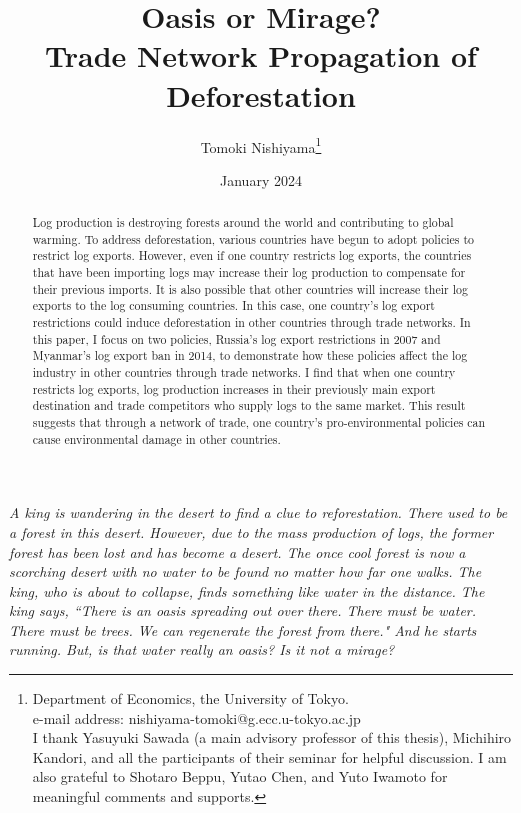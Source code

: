 \documentclass[a4paper,12pt]{article}
\begin{document}
\title{Oasis or Mirage? \\ \large{Trade Network Propagation of Deforestation}}
\author{Tomoki Nishiyama\footnote{Department of Economics, the University of Tokyo. \\ e-mail address: nishiyama-tomoki@g.ecc.u-tokyo.ac.jp \\ I thank Yasuyuki Sawada (a main advisory professor of this thesis), Michihiro Kandori, and all the participants of their seminar for helpful discussion. I am also grateful to Shotaro Beppu, Yutao Chen, and Yuto Iwamoto for meaningful comments and supports.}}
\date{January 2024}
\maketitle

\begin{abstract}
    Log production is destroying forests around the world and contributing to global warming. To address deforestation, various countries have begun to adopt policies to restrict log exports. However, even if one country restricts log exports, the countries that have been importing logs may increase their log production to compensate for their previous imports. It is also possible that other countries will increase their log exports to the log consuming countries. In this case, one country's log export restrictions could induce deforestation in other countries through trade networks. In this paper, I focus on two policies, Russia's log export restrictions in 2007 and Myanmar's log export ban in 2014, to demonstrate how these policies affect the log industry in other countries through trade networks. I find that when one country restricts log exports, log production increases in their previously main export destination and trade competitors who supply logs to the same market. This result suggests that through a network of trade, one country's pro-environmental policies can cause environmental damage in other countries.
\end{abstract}

\textit{
    A king is wandering in the desert to find a clue to reforestation. There used to be a forest in this desert. However, due to the mass production of logs, the former forest has been lost and has become a desert. The once cool forest is now a scorching desert with no water to be found no matter how far one walks. The king, who is about to collapse, finds something like water in the distance. The king says, ``There is an oasis spreading out over there. There must be water. There must be trees. We can regenerate the forest from there." And he starts running. But, is that water really an oasis? Is it not a mirage?
}
\end{document}
